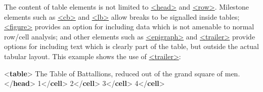 The content of table elements is not limited to \hyperref[TEI.head]{<head>} and \hyperref[TEI.row]{<row>}. Milestone elements such as \hyperref[TEI.cb]{<cb>} and \hyperref[TEI.lb]{<lb>} allow breaks to be signalled inside tables; \hyperref[TEI.figure]{<figure>} provides an option for including data which is not amenable to normal row/cell analysis; and other elements such as \hyperref[TEI.epigraph]{<epigraph>} and \hyperref[TEI.trailer]{<trailer>} provide options for including text which is clearly part of the table, but outside the actual tabular layout. This example shows the use of \hyperref[TEI.trailer]{<trailer>}: \par\bgroup{}\exampleFont \begin{shaded}\noindent\mbox{}{<\textbf{table}>}\mbox{}\newline 
{}The Table of Battallions, reduced out of the grand square of\mbox{}\newline 
\hspace*{1em}\hspace*{1em} men.{</\textbf{head}>}\mbox{}\newline 
{}\mbox{}\newline 
\hspace*{1em}1{</\textbf{cell}>}\mbox{}\newline 
\hspace*{1em}2{</\textbf{cell}>}\mbox{}\newline 
\hspace*{1em}3{</\textbf{cell}>}\mbox{}\newline 
\hspace*{1em}4{</\textbf{cell}>}\mbox{}\newline 
{}\mbox{}\newline 

\end{shaded}
